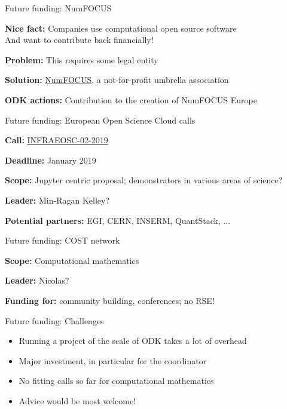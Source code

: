 \documentclass{beamer}
\begin{document}
\begin{frame}{Future funding: NumFOCUS}

  \textbf{Nice fact:} Companies use computational open source software\\\pause
  And want to contribute back financially!\bigskip\pause

  \textbf{Problem:} This requires some legal entity\bigskip\pause

  \textbf{Solution:} \href{http://numfocus.org}{NumFOCUS}, a
  not-for-profit umbrella association\bigskip\pause

  \textbf{ODK actions:} Contribution to the creation of NumFOCUS
  Europe
\end{frame}

\begin{frame}{Future funding: European Open Science Cloud calls}

  \textbf{Call:} \href{http://ec.europa.eu/research/participants/portal/desktop/en/opportunities/h2020/topics/infraeosc-02-2019.html}{INFRAEOSC-02-2019}
  \bigskip

  \textbf{Deadline:} January 2019
  \bigskip

  \textbf{Scope:} Jupyter centric proposal; demonstrators in various areas of
  science?
  \medskip

  \textbf{Leader:} Min-Ragan Kelley?
  \bigskip

  \textbf{Potential partners:} EGI, CERN, INSERM, QuantStack, ...
\end{frame}

\begin{frame}{Future funding: COST network}

  \textbf{Scope:} Computational mathematics
  \bigskip

  \textbf{Leader:} Nicolas?
  \bigskip

  \textbf{Funding for:} community building, conferences; no RSE!

\end{frame}

\begin{frame}{Future funding: Challenges}\pause
  \begin{itemize}
  \item Running a project of the scale of ODK takes a lot of overhead\pause\bigskip
  \item Major investment, in particular for the coordinator\pause\bigskip
  \item No fitting calls so far for computational mathematics\pause\bigskip
  \item Advice would be most welcome!
  \end{itemize}
\end{frame}
\end{document}

